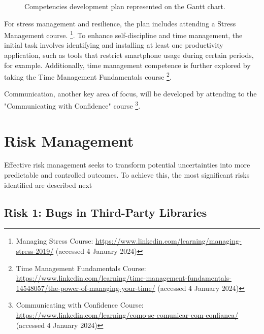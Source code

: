 \begin{figure}
      \centering
      \caption{Competencies development plan represented on the Gantt chart.}
      \label{fig:gantt_competency}
\end{figure}

For stress management and resilience, the plan includes attending a Stress Management course.
\footnote{Managing Stress Course: \url{https://www.linkedin.com/learning/managing-stress-2019/} (accessed 4 January 2024)}. To enhance self-discipline and time management, the initial task involves identifying and installing at least one productivity application, such as tools that restrict smartphone usage during certain periods, for example. Additionally, time management competence is further explored by taking the Time Management Fundamentals course
\footnote{Time Management Fundamentals Course: \url{https://www.linkedin.com/learning/time-management-fundamentals-14548057/the-power-of-managing-your-time/} (accessed 4 January 2024)}.

Communication, another key area of focus, will be developed by attending to the "Communicating with Confidence" course
\footnote{Communicating with Confidence Course: \url{https://www.linkedin.com/learning/como-se-comunicar-com-confianca/} (accessed 4 January 2024)}.

\section{Risk Management}

Effective risk management seeks to transform potential uncertainties into more predictable and controlled outcomes. To achieve this, the most significant risks identified are described next

\subsection{Risk 1: Bugs in Third-Party Libraries}

